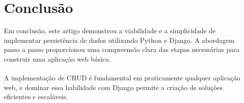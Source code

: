 \documentclass[11pt]{article} %
\begin{document}
\maketitle
\section{Conclusão}
Em conclusão, este artigo demonstrou a viabilidade e a simplicidade de implementar persistência de dados utilizando Python e Django. A abordagem passo a passo proporcionou uma compreensão clara das etapas necessárias para construir uma aplicação web básica.\\\\
A implementação de CRUD é fundamental em praticamente qualquer aplicação web, e dominar essa habilidade com Django permite a criação de soluções eficientes e escaláveis.
\end{document}
